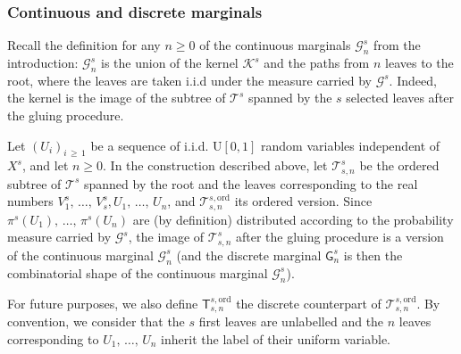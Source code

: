 \documentclass[AHL,Unicode,longabstracts,published]{cedram}
\newcommand{\ord}{\mathrm{ord}}
\newcommand{\rmU}{\mathrm{U}}
\newcommand{\cG}{\mathcal{G}}
\newcommand{\cT}{\mathcal{T}}
\newcommand{\cK}{\mathcal{K}}
\newcommand{\sG}{\mathsf{G}}
\newcommand{\sT}{\mathsf{T}}
\begin{document}
\subsubsection{Continuous and discrete marginals} Recall the definition for any $n\geq 0$ of the continuous marginals $\cG_n^s$ from the introduction: $\cG_n^s$ is the union of the kernel $\cK^s$ and the paths from $n$ leaves to the root, where the leaves are taken i.i.d under the measure carried by $\cG^s$. Indeed, the kernel is the image of the subtree of $\cT^s$ spanned by the $s$ selected leaves after the gluing procedure.

Let $(U_i)_{i\,\geq\,1}$ be a sequence of i.i.d. $\rmU[0,1]$ random variables independent of $X^s$, and let $n\geq 0$. In the construction described above, let $\cT_{s,n}^{s}$ be the ordered subtree of $\cT^s$ spanned by the root and the leaves corresponding to the real numbers $V^s_1,\,\dots,\,V_s^s,U_1,\,\dots,\, U_n$, and $\cT_{s,n}^{s,\ord}$ its ordered version. Since $\pi^s(U_1),\,\dots,\, \pi^s(U_n)$ are (by definition) distributed according to the probability measure carried by $\cG^s$, the image of $\cT_{s,n}^s$ after the gluing procedure is a version of the continuous marginal $\cG_n^s$ (and the discrete marginal $\sG_n^s$ is then the combinatorial shape of the continuous marginal $\cG_n^s$).

For future purposes, we also define $\sT_{s,n}^{s,\ord}$ the discrete counterpart of $\cT_{s,n}^{s,\ord}$. By convention, we consider that the $s$ first leaves are unlabelled and the $n$ leaves corresponding to $U_1,\,\dots,\,U_n$ inherit the label of their uniform variable.
\end{document}
